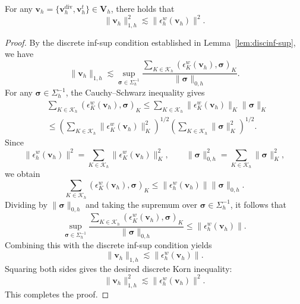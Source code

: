 \documentclass[review,hidelinks,onefignum,onetabnum]{siamart251216}
\begin{document}
\begin{lemma}
For any \(\boldsymbol{v}_h = \{\boldsymbol{v}_h^{\operatorname{div}}, \boldsymbol{v}_h^t\} \in \boldsymbol{V}_h\), there holds that
\[
\|\boldsymbol{v}_h\|_{1,h}^2 \lesssim \|\epsilon_h^w(\boldsymbol{v}_h)\|^2.
\]
\end{lemma}
\begin{proof}
By the discrete inf-sup condition established in Lemma~\ref{lem:discinf-sup}, we have
\[
\|\boldsymbol{v}_h\|_{1,h}
\lesssim
\sup_{\boldsymbol{\sigma}\in\Sigma_h^{-1}}
\frac{\sum_{K\in\mathcal{K}_h}(\epsilon_K^w(\boldsymbol{v}_h), \boldsymbol{\sigma})_K}{\|\boldsymbol{\sigma}\|_{0,h}}.
\]
For any \(\boldsymbol{\sigma}\in\Sigma_h^{-1}\), the Cauchy--Schwarz inequality gives
\begin{equation*}
\begin{aligned}
&\sum_{K\in\mathcal{K}_h}(\epsilon_K^w(\boldsymbol{v}_h), \boldsymbol{\sigma})_K
\le
\sum_{K\in\mathcal{K}_h}\|\epsilon_K^w(\boldsymbol{v}_h)\|_K \|\boldsymbol{\sigma}\|_K\\
&\le
\left(\sum_{K\in\mathcal{K}_h}\|\epsilon_K^w(\boldsymbol{v}_h)\|_K^2\right)^{1/2}
\left(\sum_{K\in\mathcal{K}_h}\|\boldsymbol{\sigma}\|_K^2\right)^{1/2}.
\end{aligned}
\end{equation*}
Since
\[
\|\epsilon_h^w(\boldsymbol{v}_h)\|^2 = \sum_{K\in\mathcal{K}_h}\|\epsilon_K^w(\boldsymbol{v}_h)\|_K^2,
\qquad
\|\boldsymbol{\sigma}\|_{0,h}^2 = \sum_{K\in\mathcal{K}_h}\|\boldsymbol{\sigma}\|_K^2,
\]
we obtain
\[
\sum_{K\in\mathcal{K}_h}(\epsilon_K^w(\boldsymbol{v}_h), \boldsymbol{\sigma})_K
\le
\|\epsilon_h^w(\boldsymbol{v}_h)\| \|\boldsymbol{\sigma}\|_{0,h}.
\]
Dividing by \(\|\boldsymbol{\sigma}\|_{0,h}\) and taking the supremum over \(\boldsymbol{\sigma}\in\Sigma_h^{-1}\), it follows that
\[
\sup_{\boldsymbol{\sigma}\in\Sigma_h^{-1}}
\frac{\sum_{K\in\mathcal{K}_h}(\epsilon_K^w(\boldsymbol{v}_h), \boldsymbol{\sigma})_K}{\|\boldsymbol{\sigma}\|_{0,h}}
\le
\|\epsilon_h^w(\boldsymbol{v}_h)\|.
\]
Combining this with the discrete inf-sup condition yields
\[
\|\boldsymbol{v}_h\|_{1,h}
\lesssim
\|\epsilon_h^w(\boldsymbol{v}_h)\|.
\]
Squaring both sides gives the desired discrete Korn inequality:
\[
\|\boldsymbol{v}_h\|_{1,h}^2 \lesssim \|\epsilon_h^w(\boldsymbol{v}_h)\|^2.
\]
This completes the proof.
\end{proof}
\end{document}
